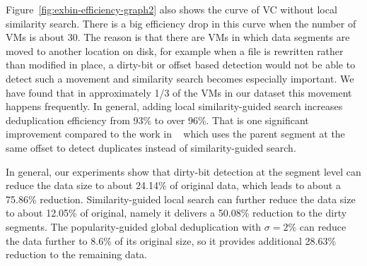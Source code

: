 
Figure~\ref{fig:exbin-efficiency-graph2} also shows the curve  of VC without local similarity search.
There is a big efficiency drop in this curve when the number of VMs is about 30.
The reason is that  
there are VMs in which
data  segments are moved to another location on disk, for example when a file is rewritten
rather than modified in place,  
a dirty-bit or offset based detection would not be able to detect such a movement and 
similarity search becomes especially important.  We have found that in
approximately 1/3 of the VMs in our dataset this movement happens frequently.
In general, adding local similarity-guided search increases deduplication efficiency from 93\% to over 96\%.
That is one significant improvement compared to the work in ~\cite{WeiZhangIEEE}
which uses the parent segment at the same offset to detect duplicates instead of similarity-guided search.

In general, our experiments show that
dirty-bit detection at the segment level can reduce the data size to about 24.14\% of original data, 
which leads to about a 75.86\% reduction.
Similarity-guided local search can further reduce the data size
to about 12.05\% of original, namely it delivers a 50.08\% reduction to the dirty segments.
The popularity-guided global deduplication with $\sigma=2\% $
can reduce the data further to 8.6\% of its original size, so
it provides additional 28.63\% reduction to the remaining data.

